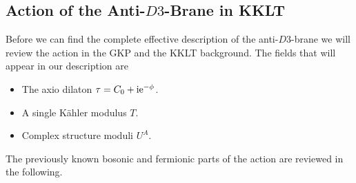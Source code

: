 \documentclass[12pt]{report}
\def\rmi{{\rm i}}
\def\rme{{\rm e}}
\begin{document}
\subsection{Action of the Anti-$D3$-Brane in KKLT}
\label{sec:D3barKKLT}
Before we can find the complete effective description of the anti-$D3$-brane we will review the action in the GKP \cite{Giddings:2001yu} and the KKLT \cite{Kachru:2003aw,Kachru:2003sx} background. The fields that will appear in our description are 
\begin{itemize}
\item The axio dilaton $\tau = C_0 + \rmi \rme^{-\phi}$.
\item A single Kähler modulus $T$.
\item Complex structure moduli $U^A$.
\end{itemize}
The previously known bosonic and fermionic parts of the action are reviewed in the following.
\end{document}
